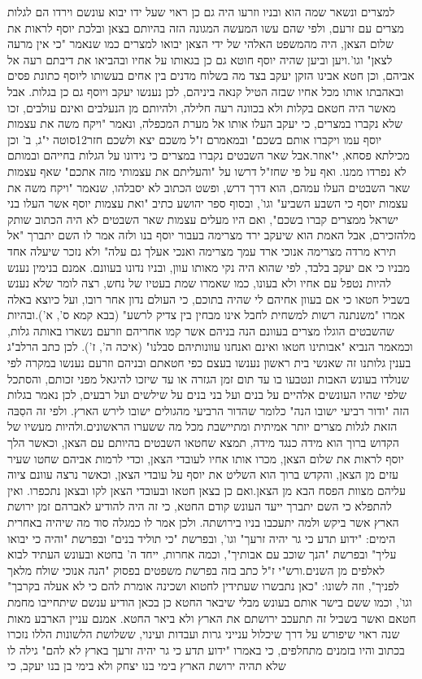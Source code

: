 \documentclass[12pt, openany]{book}
\begin{document}
למצרים ונשאר שמה הוא ובניו וזרעו היה גם כן ראוי שעל ידו יבוא עונשם וירדו הם לגלות מצרים עם זרעם, ולפי שהם עשו המעשה המגונה הזה בהיותם בצאן ובלכת יוסף לראות את שלום הצאן, היה מהמשפט האלהי של ידי הצאן יבואו למצרים כמו שנאמר "כי אין מרעה לצאן" וגו'.ויען וביען שהיה יוסף חוטא גם כן בגאותו על אחיו ובהביאו את דיבתם רעה אל אביהם, וכן חטא אבינו הזקן יעקב בצד מה בשלוח מדנים בין אחים בעשותו ליוסף כתונת פסים ובאהבתו אותו מכל אחיו שבזה הטיל קנאה ביניהם, לכן נענשו יעקב ויוסף גם כן בגלות. אבל מאשר היה חטאם בקלות ולא בכוונה רעה חלילה, ולהיותם מן הנעלבים ואינם עולבים, זכו שלא נקברו במצרים, כי יעקב העלו אותו אל מערת המכפלה, ונאמר "ויקח משה את עצמות יוסף עמו ויקברו אותם בשכם" ובמאמרם ז"ל משכם יצא ולשכם חזר12סוטה י"ג, ב' וכן מכילתא פסחא, י"אוזר.אבל שאר השבטים נקברו במצרים כי נידונו על הגלות בחייהם ובמותם לא נפרדו ממנו. ואף על פי שחז"ל דרשו על "והעליתם את עצמותי מזה אתכם" שאף עצמות שאר השבטים העלו עמהם, הוא דרך דרש, ופשט הכתוב לא יסבלהו, שנאמר "ויקח משה את עצמות יוסף כי השבע השביע" וגו', ובסוף ספר יהושע כתיב "ואת עצמות יוסף אשר העלו בני ישראל ממצרים קברו בשכם", ואם היו מעלים עצמות שאר השבטים לא היה הכתוב שותק מלהזכירם, אבל האמת הוא שיעקב ירד מצרימה בעבור יוסף בנו ולזה אמר לו השם יתברך "אל תירא מרדה מצרימה אנוכי ארד עמך מצרימה ואנכי אעלך גם עלה" ולא נזכר שיעלה אחד מבניו כי אם יעקב בלבד, לפי שהוא היה נקי מאותו עוון, ובניו נדונו בעוונם. אמנם בנימין נענש להיות נטפל עם אחיו ולא בעונו, כמו שאמרו שמת בעטיו של נחש, רצה לומר שלא נענש בשביל חטאו כי אם בעוון אחיהם לי שהיה בתוכם, כי העולם נדון אחר רובו, ועל כיוצא באלה אמרו "משנתנה רשות למשחית לחבל אינו מבחין בין צדיק לרשע" (בבא קמא ס', א').ובהיות שהשבטים הוגלו מצרים בעוונם הנה בניהם אשר קמו אחריהם וזרעם נשארו באותה גלות, וכמאמר הנביא "אבותינו חטאו ואינם ואנחנו עוונותיהם סבלנו" (איכה ה', ז'). לכן כתב הרלב"ג בענין גלותנו זה שאנשי בית ראשון נענשו בעצם כפי חטאתם ובניהם וזרעם נענשו במקרה לפי שנולדו בעונש האבות ונטבעו בו עד תום זמן הגזרה או עד שיזכו להיגאל מפני זכותם, והסתכל שלפי שהיו העונשים אלהיים על בנים ועל בני בנים על שילשים ועל רבעים, לכן נאמר בגלות הזה "ודור רביעי ישובו הנה" כלומר שהדור הרביעי מהגולים ישובו לירש הארץ. ולפי זה הסִבּה הזאת לגלות מצרים יותר אמיתית ומתיישבת מכל מה ששערו הראשונים.ולהיות מעשיו של הקדוש ברוך הוא מידה כנגד מידה, תמצא שחטאו השבטים בהיותם עם הצאן, וכאשר הלך יוסף לראות את שלום הצאן, מכרו אותו אחיו לעובדי הצאן, וכדי לרמות אביהם שחטו שעיר עזים מן הצאן, והקדש ברוך הוא השליט את יוסף על עובדי הצאן, וכאשר נרצה עוונם ציוה עליהם מצוות הפסח הבא מן הצאן.ואם כן בצאן חטאו ובעובדי הצאן לקו ובצאן נתכפרו. ואין להתפלא כי השם יתברך ייעד העונש קודם החטא, כי זה היה להודיע לאברהם זמן ירושת הארץ אשר ביקש ולמה יתעכבו בניו בירושתה. ולכן אמר לו כמגלה סוד מה שיהיה באחרית הימים: "ידוע תדע כי גר יהיה זרעך" וגו', ובפרשת "כי תוליד בנים" ובפרשת "והיה כי יבואו עליך" ובפרשת "הנך שוכב עם אבותיך", וכמה אחרות, ייחד ה' בחטא ובעונש העתיד לבוא לאלפים מן השנים.ורש"י ז"ל כתב בזה בפרשת משפטים בפסוק "הנה אנוכי שולח מלאך לפניך", וזה לשונו: "כאן נתבשרו שעתידין לחטוא ושכינה אומרת להם כי לא אעלה בקרבך" וגו', וכמו ששם בישר אותם בעונש מבלי שיבאר החטא כן בכאן הודיע ענשם שיתחייבו מחמת חטאם ואשר בשביל זה תתעכב ירושתם את הארץ ולא ביאר החטא. אמנם עניין הארבע מאות שנה ראוי שיפורש על דרך שיכלול ענייני גרות ועבדות ועינוי, ששלושת הלשונות הללו נזכרו בכתוב והיו בזמנים מתחלפים, כי באמרו "ידוע תדע כי גר יהיה זרעך בארץ לא להם" גילה לו שלא תהיה ירושת הארץ בימי בנו יצחק ולא בימי בן בנו יעקב, כי 
\end{document}
